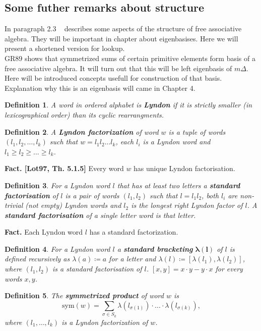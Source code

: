 \documentclass[a4paper, 12pt]{report}
\newtheorem{definition}{Definition}
\begin{document}
\subsection{Some futher remarks about structure}
In paragraph 2.3 ~\cite{Diaconis2014} describes some aspects of the structure of free associative algebra.
They will be important in chapter about eigenbasises. Here we will present a shortened version for lookup.
 \\
GR89 shows that symmetrized sums of certain primitive elements form basis of a free associative algebra.
It will turn out that this will be left eigenbasis of $m\Delta$.
Here will be introduced concepts usefull for
construction of that basis. Explanation why this is an eigenbasis will came in Chapter 4.
\begin{definition}
A word in ordered alphabet is \textbf{Lyndon} if it is strictly smaller (in lexicographical order) than its
cyclic rearrangments.
\end{definition}
\begin{definition}
A \textbf{Lyndon factorization} of word $w$ is a tuple of words $(l_1, l_2, \dots, l_k)$ such that
$w = l_1l_2\dots l_k$, each $l_i$ is a Lyndon word and $l_1 \geq l_2 \geq \dots \geq l_k$.
\end{definition}
\noindent\textbf{Fact. [Lot97, Th. 5.1.5]} Every word $w$ has unique Lyndon factorisation.
\begin{definition}
For a Lyndon word $l$ that has at least two letters a \textbf{standard factorisation} of $l$ is a pair of
words $(l_1, l_2)$ such that $l = l_1l_2$, both $l_i$ are non-trivial (not empty) Lyndon words and $l_2$
is the longest right Lyndon factor of $l$. A \textbf{standard factorisation} of a single letter word is that
letter.
\end{definition}
\noindent\textbf{Fact.} Each Lyndon word $l$ has a standard factorization.
\begin{definition}
For a Lyndon word $l$ a \textbf{standard bracketing} $\boldsymbol{\lambda(l)}$ of $l$ is defined recursively
as
$\lambda(a) \coloneqq a$ for a letter and $\lambda(l) \coloneqq [\lambda(l_1), \lambda(l_2)]$, where $(l_1,
l_2)$
is a standard factorisation of $l$. $[x, y] = x\cdot y - y\cdot x$ for every words $x, y$.
\end{definition}
\begin{definition}
The \textbf{symmetrized product} of word $w$ is
\begin{equation*}
\mathrm{sym}(w) = \sum_{\sigma \in S_k} \lambda(l_{\sigma(1)})\cdot\ldots\cdot\lambda(l_{\sigma(k)}),
\end{equation*}
where $(l_1, \dots, l_k)$ is a Lyndon factorization of $w$.
\end{definition}
\end{document}
